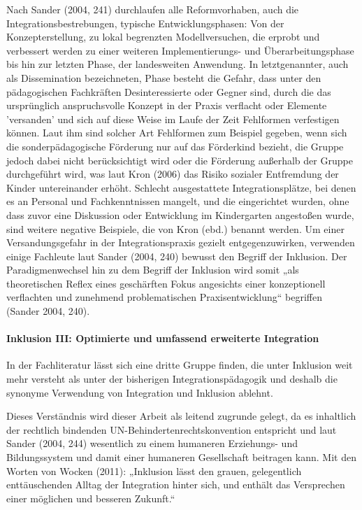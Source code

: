 Nach Sander (2004, 241) durchlaufen alle Reformvorhaben, auch die Integrationsbestrebungen, typische Entwicklungsphasen: Von der Konzepterstellung, zu lokal begrenzten Modellversuchen, die erprobt und verbessert werden zu einer weiteren Implementierungs- und Überarbeitungsphase bis hin zur letzten Phase, der landesweiten Anwendung. In letztgenannter, auch als Dissemination bezeichneten, Phase besteht die Gefahr, dass unter den pädagogischen Fachkräften Desinteressierte oder Gegner sind, durch die das ursprünglich anspruchsvolle Konzept in der Praxis verflacht oder Elemente 'versanden' und sich auf diese Weise im Laufe der Zeit Fehlformen verfestigen können. Laut ihm sind solcher Art Fehlformen zum Beispiel gegeben, wenn sich die  sonderpädagogische Förderung nur auf das Förderkind bezieht, die Gruppe jedoch dabei nicht berücksichtigt wird oder die Förderung außerhalb der Gruppe durchgeführt wird, was laut Kron (2006) das Risiko sozialer Entfremdung der Kinder untereinander erhöht. Schlecht ausgestattete Integrationsplätze, bei denen es an Personal und Fachkenntnissen mangelt, und die eingerichtet wurden, ohne dass zuvor eine Diskussion oder Entwicklung im Kindergarten angestoßen wurde, sind weitere negative Beispiele, die von Kron (ebd.) benannt werden. Um einer Versandungsgefahr in der Integrationspraxis gezielt entgegenzuwirken, verwenden einige Fachleute laut Sander (2004, 240) bewusst den Begriff der Inklusion. Der Paradigmenwechsel hin zu dem Begriff der Inklusion wird somit „als theoretischen Reflex eines geschärften Fokus angesichts einer konzeptionell verflachten und zunehmend problematischen Praxisentwicklung“ begriffen (Sander 2004, 240). 

\paragraph{Inklusion III: Optimierte und umfassend erweiterte Integration}

In der Fachliteratur lässt sich eine dritte Gruppe finden, die unter Inklusion weit mehr versteht als unter der bisherigen Integrationspädagogik und deshalb die synonyme Verwendung von Integration und Inklusion ablehnt. 

Dieses Verständnis wird dieser Arbeit als leitend zugrunde gelegt, da es inhaltlich der rechtlich bindenden UN-Behindertenrechtskonvention entspricht und laut Sander (2004, 244) wesentlich zu einem humaneren Erziehungs- und Bildungssystem und damit einer humaneren Gesellschaft beitragen kann. Mit den Worten von Wocken (2011): „Inklusion lässt den grauen, gelegentlich enttäuschenden Alltag der Integration hinter sich, und enthält das Versprechen einer möglichen und besseren Zukunft.“ 


